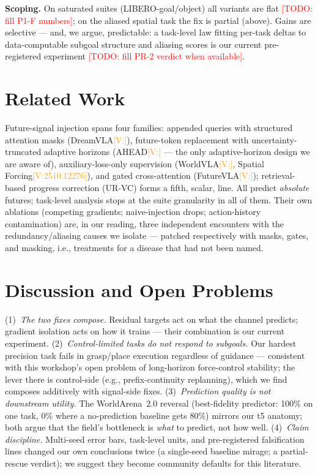 \documentclass[conference]{IEEEtran}
\newcommand{\todo}[1]{\textcolor{red}{[TODO: #1]}}
\newcommand{\verify}[1]{\textcolor{orange}{[V:#1]}}
\begin{document}
\textbf{Scoping.} On saturated suites (LIBERO-goal/object) all variants
are flat \todo{fill P1-F numbers}; on the aliased spatial task the fix
is partial (above). Gains are selective --- and, we argue, predictable:
a task-level law fitting per-task deltas to data-computable subgoal
structure and aliasing scores is our current pre-registered experiment
\todo{fill PR-2 verdict when available}.

\section{Related Work}
Future-signal injection spans four families: appended queries with
structured attention masks (DreamVLA\verify{}), future-token
replacement with uncertainty-truncated adaptive horizons
(AHEAD\verify{} --- the only adaptive-horizon design we are aware of),
auxiliary-loss-only supervision (WorldVLA\verify{}, Spatial
Forcing\verify{2510.12276}), and gated cross-attention
(FutureVLA\verify{}); retrieval-based progress correction (UR-VC)
forms a fifth, scalar, line. All predict \emph{absolute} futures; task-level
analysis stops at the suite granularity in all of them. Their own
ablations (competing gradients; naive-injection drops; action-history
contamination) are, in our reading, three independent encounters with
the redundancy/aliasing causes we isolate --- patched respectively with
masks, gates, and masking, i.e., treatments for a disease that had not
been named.

\section{Discussion and Open Problems}
(1)~\emph{The two fixes compose.} Residual targets act on what the
channel predicts; gradient isolation acts on how it trains --- their
combination is our current experiment. (2)~\emph{Control-limited tasks do
not respond to subgoals.} Our hardest precision task fails in
grasp/place execution regardless of guidance --- consistent with this
workshop's open problem of long-horizon force-control stability; the
lever there is control-side (e.g., prefix-continuity replanning), which
we find composes additively with signal-side fixes. (3)~\emph{Prediction
quality is not downstream utility.} The WorldArena~2.0 reversal
(best-fidelity predictor: 100\% on one task, 0\% where a no-prediction
baseline gets 80\%) mirrors our t5 anatomy; both argue that the field's
bottleneck is \emph{what} to predict, not how well. (4)~\emph{Claim
discipline.} Multi-seed error bars, task-level units, and
pre-registered falsification lines changed our own conclusions twice
(a single-seed baseline mirage; a partial-rescue verdict); we suggest
they become community defaults for this literature.

\nocite{*}  %


\end{document}
